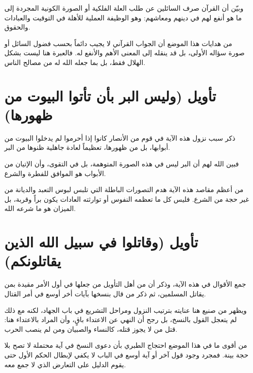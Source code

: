 وبيّن أن القرآن صرف السائلين عن طلب العلة الفلكية أو الصورة الكونية المجردة إلى ما هو أنفع لهم في دينهم ومعاشهم: وهو الوظيفة العملية للأهلة في التوقيت والعبادات والحقوق.

\begin{fawaid}
من هدايات هذا الموضع أن الجواب القرآني لا يجيب دائماً بحسب فضول السائل أو صورة سؤاله الأولى، بل قد ينقله إلى المعنى الأهم والأنفع له. فالعبرة هنا ليست بشكل الهلال فقط، بل بما جعله الله له من مصالح الناس.
\end{fawaid}

\section{تأويل (وليس البر بأن تأتوا البيوت من ظهورها)}
ذكر  سبب نزول هذه الآية في قوم من الأنصار كانوا إذا أحرموا لم يدخلوا البيوت من أبوابها، بل من ظهورها، تعظيماً لعادة جاهلية ظنوها من البر.

فبين الله لهم أن البر ليس في هذه الصورة المتوهمة، بل في التقوى، وأن الإتيان من الأبواب هو الموافق للفطرة والشرع.

\begin{fawaid}
من أعظم مقاصد هذه الآية هدم التصورات الباطلة التي تلبس لبوس التعبد والديانة من غير حجة من الشرع. فليس كل ما تعظمه النفوس أو توارثته العادات يكون براً وقربة، بل الميزان هو ما شرعه الله.
\end{fawaid}

\separator

\section{تأويل (وقاتلوا في سبيل الله الذين يقاتلونكم)}
جمع  الأقوال في هذه الآية، وذكر أن من أهل التأويل من جعلها في أول الأمر مقيدة بمن يقاتل المسلمين، ثم ذكر من قال بنسخها بآيات أخر أوسع في أمر القتال.

ويظهر من صنيع  هنا عنايته بترتيب النزول ومراحل التشريع في باب الجهاد، لكنه مع ذلك لم يتعجل القول بالنسخ، بل رجح أن النهي عن الاعتداء باقٍ، وأن المراد بالاعتداء هنا: قتل من لا يجوز قتله، كالنساء والصبيان ومن لم ينصب الحرب.

\begin{fawaid}
من أقوى ما في هذا الموضع احتجاج الطبري بأن دعوى النسخ في آية محتملة لا تصح بلا حجة بينة. فمجرد وجود قول آخر أو آية أوسع في الباب لا يكفي لإبطال الحكم الأول حتى يقوم الدليل على التعارض الذي لا جمع معه.
\end{fawaid}

